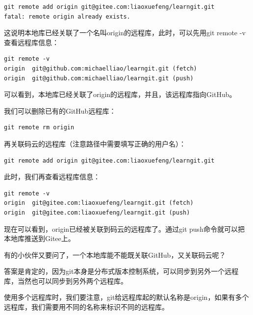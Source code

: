 \begin{verbatim}
git remote add origin git@gitee.com:liaoxuefeng/learngit.git
fatal: remote origin already exists.
\end{verbatim}

这说明本地库已经关联了一个名叫origin的远程库，此时，可以先用git remote -v查看远程库信息：

\begin{verbatim}
git remote -v
origin	git@github.com:michaelliao/learngit.git (fetch)
origin	git@github.com:michaelliao/learngit.git (push)
\end{verbatim}

可以看到，本地库已经关联了origin的远程库，并且，该远程库指向GitHub。

我们可以删除已有的GitHub远程库：

\begin{verbatim}
git remote rm origin
\end{verbatim}

再关联码云的远程库（注意路径中需要填写正确的用户名）：

\begin{verbatim}
git remote add origin git@gitee.com:liaoxuefeng/learngit.git
\end{verbatim}

此时，我们再查看远程库信息：

\begin{verbatim}
git remote -v
origin	git@gitee.com:liaoxuefeng/learngit.git (fetch)
origin	git@gitee.com:liaoxuefeng/learngit.git (push)
\end{verbatim}

现在可以看到，origin已经被关联到码云的远程库了。通过git push命令就可以把本地库推送到Gitee上。

有的小伙伴又要问了，一个本地库能不能既关联GitHub，又关联码云呢？

答案是肯定的，因为git本身是分布式版本控制系统，可以同步到另外一个远程库，当然也可以同步到另外两个远程库。

使用多个远程库时，我们要注意，git给远程库起的默认名称是origin，如果有多个远程库，我们需要用不同的名称来标识不同的远程库。

